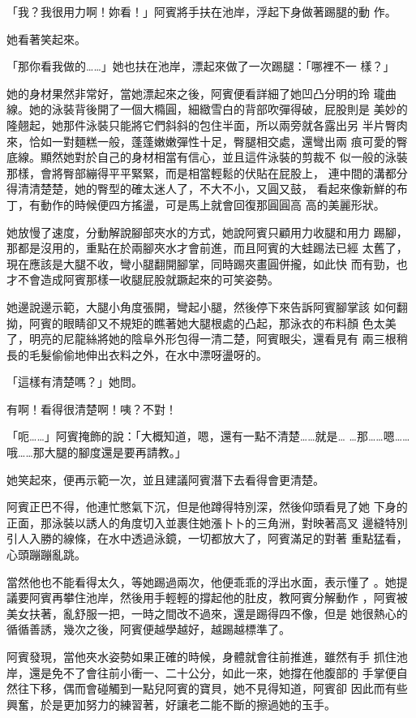 「我？我很用力啊！妳看！」阿賓將手扶在池岸，浮起下身做著踢腿的動
作。

她看著笑起來。

「那你看我做的……」她也扶在池岸，漂起來做了一次踢腿：「哪裡不一
樣？」

她的身材果然非常好，當她漂起來之後，阿賓便看詳細了她凹凸分明的玲
瓏曲線。她的泳裝背後開了一個大橢圓，細緻雪白的背部吹彈得破，屁股則是
美妙的隆翹起，她那件泳裝只能將它們斜斜的包住半面，所以兩旁就各露出另
半片臀肉來，恰如一對麵糕一般，蓬蓬嫩嫩彈性十足，臀腿相交處，還彎出兩
痕可愛的臀底線。顯然她對於自己的身材相當有信心，並且這件泳裝的剪裁不
似一般的泳裝那樣，會將臀部繃得平平緊緊，而是相當輕鬆的伏貼在屁股上，
連中間的溝都分得清清楚楚，她的臀型的確太迷人了，不大不小，又圓又鼓，
看起來像新鮮的布丁，有動作的時候便四方搖盪，可是馬上就會回復那圓圓高
高的美麗形狀。

她放慢了速度，分動解說腳部夾水的方式，她說阿賓只顧用力收腿和用力
踢腳，那都是沒用的，重點在於兩腳夾水才會前進，而且阿賓的大蛙踢法已經
太舊了，現在應該是大腿不收，彎小腿翻開腳掌，同時踢夾畫圓併攏，如此快
而有勁，也才不會造成阿賓那樣一收腿屁股就蹶起來的可笑姿勢。

她邊說邊示範，大腿小角度張開，彎起小腿，然後停下來告訴阿賓腳掌該
如何翻拗，阿賓的眼睛卻又不規矩的瞧著她大腿根處的凸起，那泳衣的布料顏
色太美了，明亮的尼龍絲將她的陰阜外形包得一清二楚，阿賓眼尖，還看見有
兩三根稍長的毛髮偷偷地伸出衣料之外，在水中漂呀盪呀的。

「這樣有清楚嗎？」她問。

有啊！看得很清楚啊！咦？不對！

「呃……」阿賓掩飾的說：「大概知道，嗯，還有一點不清楚……就是…
…那……嗯……哦……那大腿的腳度還是要再請教。」

她笑起來，便再示範一次，並且建議阿賓潛下去看得會更清楚。

阿賓正巴不得，他連忙憋氣下沉，但是他蹲得特別深，然後仰頭看見了她
下身的正面，那泳裝以誘人的角度切入並裹住她漲卜卜的三角洲，對映著高叉
邊縫特別引人入勝的線條，在水中透過泳鏡，一切都放大了，阿賓滿足的對著
重點猛看，心頭蹦蹦亂跳。

當然他也不能看得太久，等她踢過兩次，他便乖乖的浮出水面，表示懂了
。她提議要阿賓再攀住池岸，然後用手輕輕的撐起他的肚皮，教阿賓分解動作
，阿賓被美女扶著，亂舒服一把，一時之間改不過來，還是踢得四不像，但是
她很熱心的循循善誘，幾次之後，阿賓便越學越好，越踢越標準了。

阿賓發現，當他夾水姿勢如果正確的時候，身體就會往前推進，雖然有手
抓住池岸，還是免不了會往前小衝一、二十公分，如此一來，她撐在他腹部的
手掌便自然往下移，偶而會碰觸到一點兒阿賓的寶貝，她不見得知道，阿賓卻
因此而有些興奮，於是更加努力的練習著，好讓老二能不斷的擦過她的玉手。

